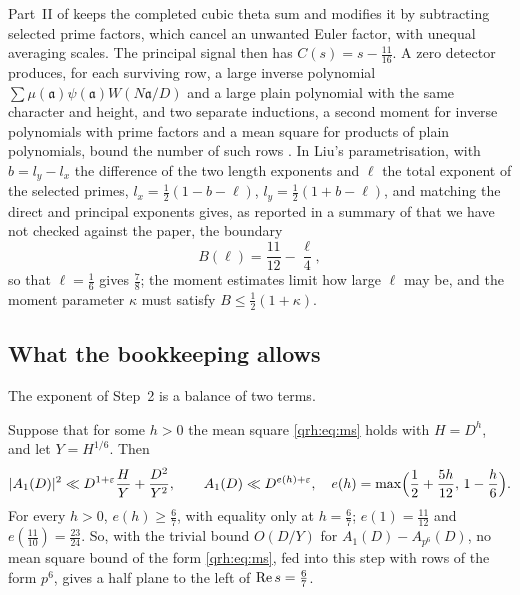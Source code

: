 Part~II of \cite{OAI26a} keeps the completed cubic theta sum and modifies it by subtracting selected prime factors, which cancel an unwanted Euler factor, with unequal averaging scales. The principal signal then has $C(s)=s-\frac{11}{16}$. A zero detector produces, for each surviving row, a large inverse polynomial $\sum\mu(\mathfrak a)\psi(\mathfrak a)W(N\mathfrak a/D)$ and a large plain polynomial with the same character and height, and two separate inductions, a second moment for inverse polynomials with prime factors and a mean square for products of plain polynomials, bound the number of such rows \cite[overview, pp.~5 to~7]{OAI26a}. In Liu's parametrisation, with $b=l_y-l_x$ the difference of the two length exponents and $\ell$ the total exponent of the selected primes, $l_x=\frac12(1-b-\ell)$, $l_y=\frac12(1+b-\ell)$, and matching the direct and principal exponents gives, as reported in a summary of \cite{Liu26a} that we have not checked against the paper, the boundary
\begin{equation}\label{qrh:eq:Bl}
B(\ell)=\frac{11}{12}-\frac\ell4,
\end{equation}
so that $\ell=\frac16$ gives $\frac78$; the moment estimates limit how large $\ell$ may be, and the moment parameter $\kappa$ must satisfy $B\le\frac12(1+\kappa)$.

\subsection{What the bookkeeping allows}

The exponent of Step~2 is a balance of two terms.

\begin{proposition}\label{qrh:prop:balance}
Suppose that for some $h>0$ the mean square \eqref{qrh:eq:ms} holds with $H=D^h$, and let $Y=H^{1/6}$. Then
\begin{equation}\label{qrh:eq:balance}
|A_1(D)|^2\ll D^{1+\varepsilon}\frac HY+\frac{D^2}{Y^2},\qquad A_1(D)\ll D^{e(h)+\varepsilon},\quad e(h)=\max\Bigl(\frac12+\frac{5h}{12},\,1-\frac h6\Bigr).
\end{equation}
For every $h>0$, $e(h)\ge\frac67$, with equality only at $h=\frac67$; $e(1)=\frac{11}{12}$ and $e(\frac{11}{10})=\frac{23}{24}$. So, with the trivial bound $O(D/Y)$ for $A_1(D)-A_{p^6}(D)$, no mean square bound of the form \eqref{qrh:eq:ms}, fed into this step with rows of the form $p^6$, gives a half plane to the left of $\operatorname{Re} s=\frac67$.
\end{proposition}

